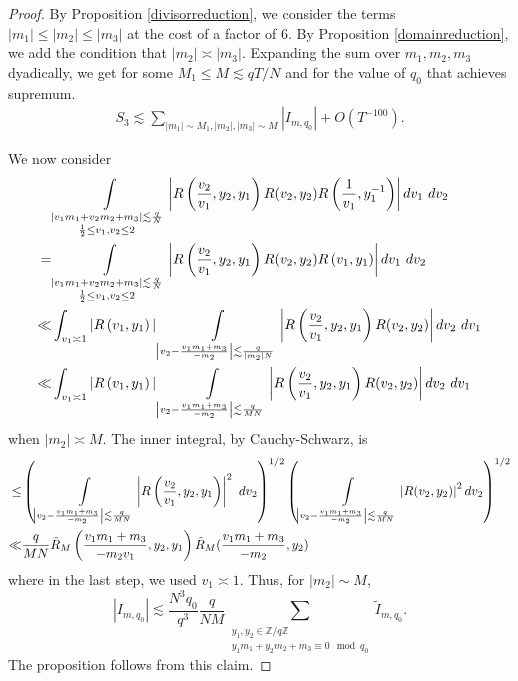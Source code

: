\begin{proof}
By Proposition \ref{divisorreduction}, we consider the terms $|m_1|\leq |m_2|\leq|m_3|$ at the cost of a factor of $6$. By Proposition \ref{domainreduction}, we add the condition that $|m_2|\asymp|m_3|$. Expanding the sum over $m_1,m_2,m_3$ dyadically, we get for some $M_1\leq M \lesssim qT/N $ and for the value of $q_0$ that achieves supremum. \begin{align*}
    S_3\lesssim \sum_{|m_1|\sim M_1,|m_2|,|m_3|\sim M}|I_{m,q_0}| + O(T^{-100}).
\end{align*}

We now consider
\begin{align*} 
    & \int\displaylimits_{\substack{
        |v_1m_1+v_2m_2+m_3|\lesssim \frac{q}{N}\\
        \frac{1}{2}\leq v_1,v_2\leq 2
    }} \left| R\left(\frac{v_2}{v_1},y_2,y_1\right)
    R(v_2,y_2)R\left(\frac{1}{v_1},y_1^{-1}\right)\right| dv_1 \ dv_2\\
    = 
   & \int\displaylimits_{\substack{
        |v_1m_1+v_2m_2+m_3|\lesssim \frac{q}{N}\\
        \frac{1}{2}\leq v_1,v_2\leq 2
    }} \left| R\left(\frac{v_2}{v_1},y_2,y_1\right)
    R(v_2,y_2)R\left(v_1,y_1\right)\right| dv_1 \ dv_2\\
     \ll& 
    \int_{v_1\asymp 1} |R\left(v_1,y_1\right)|
    \int\displaylimits_{\left|v_2 - \frac{v_1m_1+m_3}{-m_2}\right|\lesssim \frac{q}{|m_2|N}} \left| R\left(\frac{v_2}{v_1},y_2,y_1\right)
    R(v_2,y_2)\right|  dv_2 \ dv_1\\
    \ll& \int_{v_1\asymp 1} |R\left(v_1,y_1\right)|
    \int\displaylimits_{\left|v_2 - \frac{v_1m_1+m_3}{-m_2}\right|\lesssim \frac{q}{MN}} \left| R\left(\frac{v_2}{v_1},y_2,y_1\right)
    R(v_2,y_2)\right|  dv_2 \ dv_1\\
\end{align*}
when $|m_2|\asymp M$. The inner integral, by Cauchy-Schwarz,
is \begin{align*}
    \leq & \left(\int\displaylimits_{\left|v_2 - \frac{v_1m_1+m_3}{-m_2}\right|\lesssim \frac{q}{MN}} \left| R\left(\frac{v_2}{v_1},y_2,y_1\right)\right|^2 \ dv_2 \right)^{1/2}
    \left(
    \int\displaylimits_{\left|v_2 - \frac{v_1m_1+m_3}{-m_2}\right|\lesssim \frac{q}{MN}} \left|
    R(v_2,y_2)\right|^2  dv_2\right)^{1/2}\\
    \ll& \frac{q}{MN} \tilde{R}_M\left(\frac{v_1m_1+m_3}{-m_2v_1},y_2,y_1\right)  \tilde{R}_M(\frac{v_1m_1+m_3}{-m_2},y_2)
\end{align*}
where in the last step, we used $v_1\asymp 1$.
Thus, for $|m_2|\sim M$,
\[
|I_{m,q_0}|\lesssim \frac{N^3q_0}{q^3} \frac{q}{NM}\sum_{\substack{y_1,y_2 \in\mathbb{Z}/q\mathbb{Z} \\ y_1m_1+y_2m_2+m_3\equiv 0 \mod q_0}} \tilde{I}_{m,q_0}.
\]
The proposition follows from this claim.
\end{proof}
